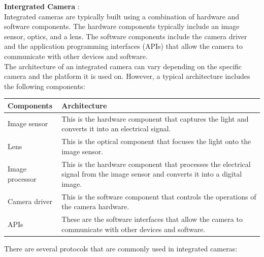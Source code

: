 \documentclass{report}
\begin{document}
\begin{multicols}{1}
{        \textbf{Intergrated Camera} : \\
         Integrated cameras are typically built using a combination of hardware and software components. The hardware components typically include an image sensor, optics, and a lens. The software components include the camera driver and the application programming interfaces (APIs) that allow the camera to communicate with other devices and software.\\

         The architecture of an integrated camera can vary depending on the specific camera and the platform it is used on. However, a typical architecture includes the following components: \\ 
  
        \begin{tabular}{ | m{6em} | m{5cm} | } 
            \hline
            \textbf Components  & Architecture\\ 
            \hline
            Image sensor & This is the hardware component that captures the light and converts it into an electrical signal. \\ 
            \hline
            Lens & This is the optical component that focuses the light onto the image sensor.\\ 
            \hline
            Image processor & This is the hardware component that processes the electrical signal from the image sensor and converts it into a digital image.\\
            \hline
            Camera driver & This is the software component that controls the operations of the camera hardware.\\
            \hline
            APIs & These are the software interfaces that allow the camera to communicate with other devices and software.\\
            \hline 
        \end{tabular}

\vspace*{0.3cm}
\textit{}

        There are several protocols that are commonly used in integrated cameras: \\ 
           
}
\end{multicols}
\end{document}
